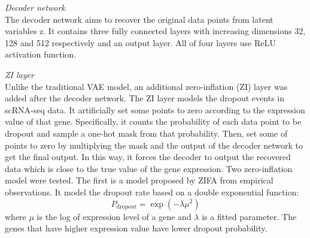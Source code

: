 \vspace{0.5cm}
\noindent\emph{Decoder network} \\
The decoder network aims to recover the original data points from latent variables z. It contains three fully connected layers with increasing dimensions 32, 128 and 512 respectively and an output layer. All of four layers use ReLU activation function. 

\vspace{0.5cm}
\noindent\emph{ZI layer} \\
Unlike the traditional VAE model, an additional zero-inflation (ZI) layer was added after the decoder network. The ZI layer models the dropout events in scRNA-seq data. It artificially set some points to zero according to the expression value of that gene. Specifically, it counts the probability of each data point to be dropout and sample a one-hot mask from that probability. Then, set some of points to zero by multiplying the mask and the output of the decoder network to get the final output. In this way, it forces the decoder to output the recovered data which is close to the true value of the gene expression. Two zero-inflation model were tested. The first is a model proposed by ZIFA \cite{Pierson2015} from empirical observations. It model the dropout rate based on a double exponential function: 
\begin{equation}
    P_{\text {dropout}}=\exp \left(-\lambda \mu^{2}\right)
\end{equation}
where $\mu$ is the log of expression level of a gene and $\lambda$ is a fitted parameter. The genes that have higher expression value have lower dropout probability.  

